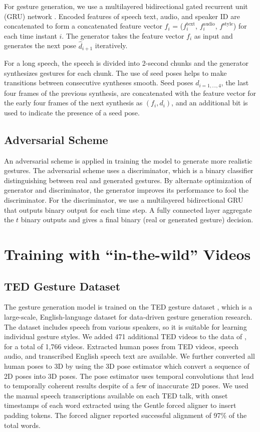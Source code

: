 \documentclass[acmtog]{acmart}
\begin{document}
For gesture generation, we use a multilayered bidirectional gated recurrent unit (GRU) network \cite{cho2014learning}. Encoded features of speech text, audio, and speaker ID are concatenated to form a concatenated feature vector $f_i$ = ($f_i^\textrm{text}$, $f_i^\textrm{audio}$, $f^\textrm{style}$) for each time instant $i$. The generator takes the feature vector $f_i$ as input and generates the next pose $\hat{d}_{i+1}$ iteratively. 

For a long speech, the speech is divided into 2-second chunks and the generator synthesizes gestures for each chunk. The use of seed poses helps to make transitions between consecutive syntheses smooth. Seed poses $d_{i=1,...,4}$, the last four frames of the previous synthesis, are concatenated with the feature vector for the early four frames of the next synthesis as $(f_i, d_i)$, and an additional bit is used to indicate the presence of a seed pose.

\subsection{Adversarial Scheme}
An adversarial scheme \cite{goodfellow2014generative} is applied in training the model to generate more realistic gestures. The adversarial scheme uses a discriminator, which is a binary classifier distinguishing between real and generated gestures. By alternate optimization of generator and discriminator, the generator improves its performance to fool the discriminator. For the discriminator, we use a multilayered bidirectional GRU that outputs binary output for each time step. A fully connected layer aggregate the $t$ binary outputs and gives a final binary (real or generated gesture) decision.
 \section{Training with ``in-the-wild'' Videos} \label{sec:training}

\subsection{TED Gesture Dataset}
The gesture generation model is trained on the TED gesture dataset \cite{yoon2019robots}, which is a large-scale, English-language dataset for data-driven gesture generation research. The dataset includes speech from various speakers, so it is suitable for learning individual gesture styles. We added 471 additional TED videos to the data of \cite{yoon2019robots}, for a total of 1,766 videos. Extracted human poses from TED videos, speech audio, and transcribed English speech text are available. We further converted all human poses to 3D by using the 3D pose estimator \cite{pavllo20193d} which convert a sequence of 2D poses into 3D poses. The pose estimator uses temporal convolutions that lead to temporally coherent results despite of a few of inaccurate 2D poses. We used the manual speech transcriptions available on each TED talk, with onset timestamps of each word extracted using the Gentle forced aligner \cite{ochshorn2016gentle} to insert padding tokens. The forced aligner reported successful alignment of 97\% of the total words.
\end{document}
